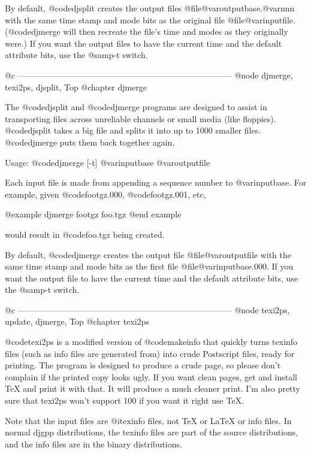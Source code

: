 By default, @code{djsplit} creates the output files
@file{@var{outputbase}.@var{nnn}} with the same time stamp and mode bits
as the original file @file{@var{inputfile}}.  (@code{djmerge} will then
recreate the file's time and modes as they originally were.)  If you
want the output files to have the current time and the default attribute
bits, use the @samp{-t} switch.

@c -----------------------------------------------------------------------------
@node djmerge, texi2ps, djsplit, Top
@chapter djmerge

The @code{djsplit} and @code{djmerge} programs are designed to assist in
transporting files across unreliable channels or small media (like
floppies).  @code{djsplit} takes a big file and splits it into up to 1000
smaller files.  @code{djmerge} puts them back together again.

Usage: @code{djmerge [-t] @var{inputbase} @var{outputfile}}

Each input file is made from appending a sequence number to
@var{inputbase}.  For example, given @code{footgz.000},
@code{footgz.001}, etc,

@example
djmerge footgz foo.tgz
@end example

would result in @code{foo.tgz} being created.

By default, @code{djmerge} creates the output file
@file{@var{outputfile}} with the same time stamp and mode bits as the
first file @file{@var{inputbase}.000}.  If you want the output file to
have the current time and the default attribute bits, use the @samp{-t}
switch.

@c -----------------------------------------------------------------------------
@node texi2ps, update, djmerge, Top
@chapter texi2ps

@code{texi2ps} is a modified version of @code{makeinfo} that quickly turns
texinfo files (such as info files are generated from) into crude
Postscript files, ready for printing.  The program is designed to
produce a crude page, so please don't complain if the printed copy looks
ugly.  If you want clean pages, get and install TeX and print it with
that.  It will produce a much cleaner print.  I'm also pretty sure that
texi2ps won't support 100%
if you want it right use TeX.

Note that the input files are @i{texinfo} files, not TeX or LaTeX or
info files.  In normal djgpp distributions, the texinfo files are part
of the source distributions, and the info files are in the binary
distributions.

